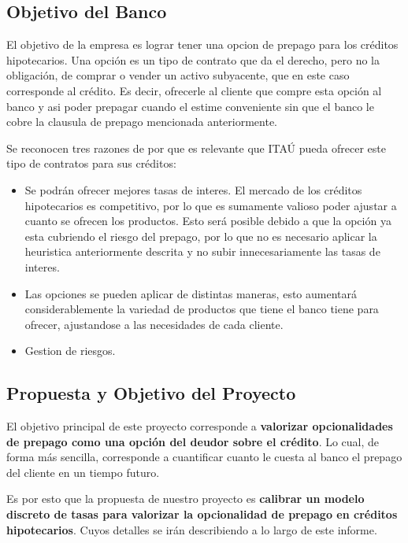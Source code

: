 \subsection{Objetivo del Banco}

\qquad El objetivo de la empresa es lograr tener una opcion de prepago para los créditos hipotecarios. Una opción es un tipo de contrato que da el derecho, pero no la obligación, de comprar o vender un activo subyacente, que en este caso corresponde al crédito. Es decir, ofrecerle al cliente que compre esta opción al banco y asi poder prepagar cuando el estime conveniente sin que el banco le cobre la clausula de prepago mencionada anteriormente.

\qquad Se reconocen tres razones de por que es relevante que ITAÚ pueda ofrecer este tipo de contratos para sus créditos:

\begin{itemize}
    \item Se podrán ofrecer mejores tasas de interes. El mercado de los créditos hipotecarios es competitivo, por lo que es sumamente valioso poder ajustar a cuanto se ofrecen los productos. Esto será posible debido a que la opción ya esta cubriendo el riesgo del prepago, por lo que no es necesario aplicar la heuristica anteriormente descrita y no subir innecesariamente las tasas de interes.
    \item Las opciones se pueden aplicar de distintas maneras, esto aumentará considerablemente la variedad de productos que tiene el banco tiene para ofrecer, ajustandose a las necesidades de cada cliente.
    \item Gestion de riesgos.
\end{itemize}

\subsection{Propuesta y Objetivo del Proyecto}

\qquad El objetivo principal de este proyecto corresponde a \textbf{valorizar opcionalidades de prepago como una opción del deudor sobre el crédito}. Lo cual, de forma más sencilla, corresponde a cuantificar cuanto le cuesta al banco el prepago del cliente en un tiempo futuro.

\qquad Es por esto que la propuesta de nuestro proyecto es \textbf{calibrar un modelo discreto de tasas para valorizar la opcionalidad de prepago en créditos hipotecarios}. Cuyos detalles se irán describiendo a lo largo de este informe.